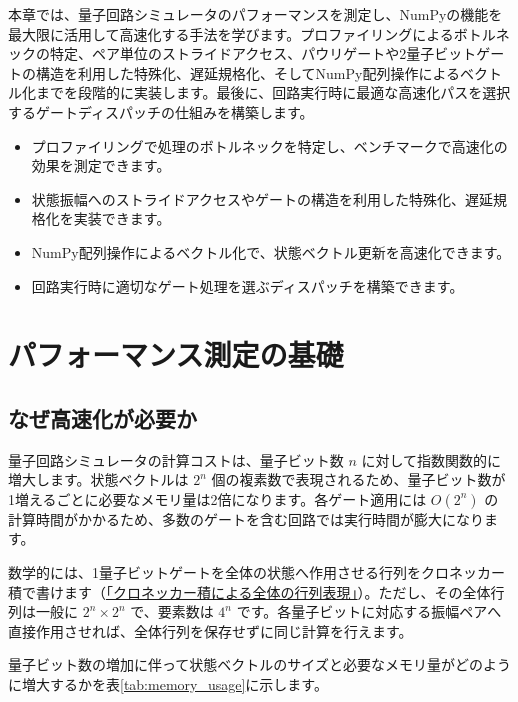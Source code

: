 本章では、量子回路シミュレータのパフォーマンスを測定し、NumPyの機能を最大限に活用して高速化する手法を学びます。プロファイリングによるボトルネックの特定、ペア単位のストライドアクセス、パウリゲートや2量子ビットゲートの構造を利用した特殊化、遅延規格化、そしてNumPy配列操作によるベクトル化までを段階的に実装します。最後に、回路実行時に最適な高速化パスを選択するゲートディスパッチの仕組みを構築します。

\begin{chaptergoal}
\begin{itemize}
\item プロファイリングで処理のボトルネックを特定し、ベンチマークで高速化の効果を測定できます。
\item 状態振幅へのストライドアクセスやゲートの構造を利用した特殊化、遅延規格化を実装できます。
\item NumPy配列操作によるベクトル化で、状態ベクトル更新を高速化できます。
\item 回路実行時に適切なゲート処理を選ぶディスパッチを構築できます。
\end{itemize}
\end{chaptergoal}

\section{パフォーマンス測定の基礎}

\subsection{なぜ高速化が必要か}

量子回路シミュレータの計算コストは、量子ビット数 $n$ に対して指数関数的に増大します。状態ベクトルは $2^n$ 個の複素数で表現されるため、量子ビット数が1増えるごとに必要なメモリ量は2倍になります。各ゲート適用には $O(2^n)$ の計算時間がかかるため、多数のゲートを含む回路では実行時間が膨大になります。

数学的には、1量子ビットゲートを全体の状態へ作用させる行列をクロネッカー積で書けます（\hyperref[sec:3-2-kron]{「クロネッカー積による全体の行列表現」}）。ただし、その全体行列は一般に $2^n\times2^n$ で、要素数は $4^n$ です。各量子ビットに対応する振幅ペアへ直接作用させれば、全体行列を保存せずに同じ計算を行えます。

量子ビット数の増加に伴って状態ベクトルのサイズと必要なメモリ量がどのように増大するかを表\ref{tab:memory_usage}に示します。

